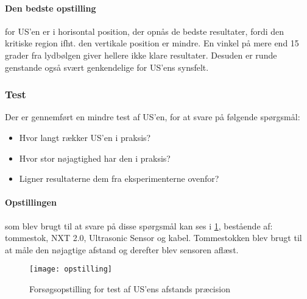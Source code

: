 \paragraph{Den bedste opstilling} for US'en er i horisontal position, der opnås de bedste resultater, fordi den kritiske region ifht. den vertikale position er mindre.
En vinkel på mere end 15 grader fra lydbølgen giver hellere ikke klare resultater.
Desuden er runde genstande også svært genkendelige for US'ens synsfelt.

\subsubsection{Test}
Der er gennemført en mindre test af US'en, for at svare på følgende spørgsmål:

\begin{itemize}
\item Hvor langt rækker US'en i praksis?
\item Hvor stor nøjagtighed har den i praksis?
\item Ligner resultaterne dem fra eksperimenterne ovenfor?
\end{itemize}

\paragraph{Opstillingen} som blev brugt til at svare på disse spørgsmål kan ses i \cref{sensor:ultrasonic_opstilling}, bestående af: tommestok, NXT 2.0, \legoms Ultrasonic Sensor og \legoms kabel.
Tommestokken blev brugt til at måle den nøjagtige afstand og derefter blev sensoren aflæst.

\begin{figure}[h]
\centering
\texttt{[image: opstilling]}
\caption{Forsøgsopstilling for test af US'ens afstands præcision}
\label{sensor:ultrasonic_opstilling}
\end{figure}

